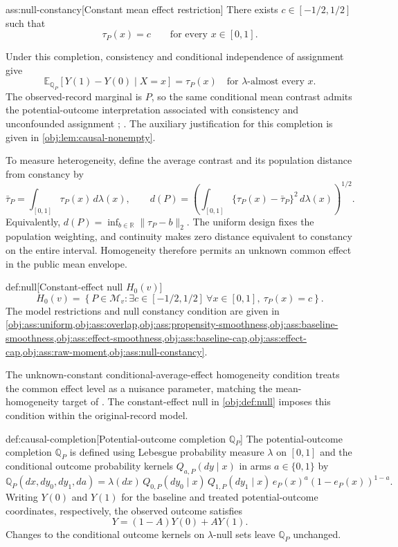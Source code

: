 \begin{assumptionv}{ass:null-constancy}[Constant mean effect restriction]
There exists \(c\in[-1/2,1/2]\) such that
\[
\tau_P(x)=c
\qquad\text{for every }x\in[0,1].
\]
\end{assumptionv}

Under this completion, consistency and conditional independence of assignment give
\[
\mathbb E_{\mathbb Q_P}[Y(1)-Y(0)\mid X=x]=\tau_P(x)
\quad\text{for }\lambda\text{-almost every }x.
\]
The observed-record marginal is \(P\), so the same conditional mean contrast admits the potential-outcome interpretation associated with consistency and unconfounded assignment \citep[Section 3]{Rubin1974}; \citep[Section 2]{Rosenbaum1983}. The auxiliary justification for this completion is given in \cref{obj:lem:causal-nonempty}.

To measure heterogeneity, define the average contrast  and its population distance from constancy  by
\[
\bar\tau_P=\int_{[0,1]}\tau_P(x)\,d\lambda(x),
\qquad
d(P)
=
\left(
\int_{[0,1]}\{\tau_P(x)-\bar\tau_P\}^{2}\,d\lambda(x)
\right)^{1/2}.
\]
Equivalently, \(d(P)=\inf_{b\in\mathbb R}\|\tau_P-b\|_2\). The uniform design fixes the population weighting, and continuity makes zero distance equivalent to constancy on the entire interval. Homogeneity therefore permits an unknown common effect  in the public mean envelope.

\begin{definitionv}{def:null}[Constant-effect null $H_0(v)$]
\[
H_0(v)
=
\left\{
P\in\mathcal M_v:
\exists c\in[-1/2,1/2]\ 
\forall x\in[0,1],\ \tau_P(x)=c
\right\}.
\]
The model restrictions and null constancy condition are given in \cref{obj:ass:uniform,obj:ass:overlap,obj:ass:propensity-smoothness,obj:ass:baseline-smoothness,obj:ass:effect-smoothness,obj:ass:baseline-cap,obj:ass:effect-cap,obj:ass:raw-moment,obj:ass:null-constancy}.
\end{definitionv}

The unknown-constant conditional-average-effect homogeneity condition treats the common effect level as a nuisance parameter, matching the mean-homogeneity target of \citep{CrumpHotzImbensMitnik2008Homogeneity}. The constant-effect null  in \cref{obj:def:null} imposes this condition within the original-record model.

\begin{definitionv}{def:causal-completion}[Potential-outcome completion $\mathbb Q_P$]
The potential-outcome completion \(\mathbb Q_P\) is defined using Lebesgue probability measure \(\lambda\) on \([0,1]\) and the conditional outcome probability kernels \(Q_{a,P}(dy\mid x)\) in arms \(a\in\{0,1\}\) by
\[
\mathbb Q_P(dx,dy_0,dy_1,da)
=
\lambda(dx)\,Q_{0,P}(dy_0\mid x)\,Q_{1,P}(dy_1\mid x)\,
e_P(x)^a(1-e_P(x))^{1-a}.
\]
Writing \(Y(0)\) and \(Y(1)\) for the baseline and treated potential-outcome coordinates, respectively, the observed outcome satisfies
\[
Y=(1-A)Y(0)+AY(1).
\]
Changes to the conditional outcome kernels on \(\lambda\)-null sets leave \(\mathbb Q_P\) unchanged.
\end{definitionv}

